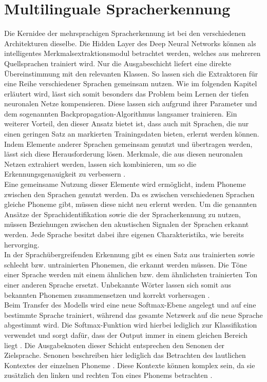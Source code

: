 \section{Multilinguale Spracherkennung}
Die Kernidee der mehrsprachigen Spracherkennung ist bei den verschiedenen Architekturen dieselbe. Die Hidden Layer des Deep Neural Networks können als intelligentes Merkmalsextraktionsmodul betrachtet werden, welches aus mehreren Quellsprachen trainiert wird. Nur die Ausgabeschicht liefert eine direkte Übereinstimmung mit den relevanten Klassen. So lassen sich die Extraktoren für eine Reihe verschiedener Sprachen gemeinsam nutzen. 
Wie im folgenden Kapitel erläutert wird, lässt sich somit besonders das Problem beim Lernen der tiefen neuronalen Netze kompensieren. Diese lassen sich aufgrund ihrer Parameter und dem sogenannten Backpropagation-Algorithmus langsamer trainieren. Ein weiterer Vorteil, den dieser Ansatz bietet ist, dass auch mit Sprachen, die nur einen geringen Satz an markierten Trainingsdaten bieten, erlernt werden können. Indem Elemente anderer Sprachen gemeinsam genutzt und übertragen werden, lässt sich diese Herausforderung lösen. Merkmale, die aus diesen neuronalen Netzen extrahiert werden, lassen sich kombinieren, um so die Erkennungsgenauigkeit zu verbessern {\cite{Yu.2014}}.
\\
Eine gemeinsame Nutzung dieser Elemente wird ermöglicht, indem Phoneme zwischen den Sprachen genutzt werden. Da es zwischen verschiedenen Sprachen gleiche Phoneme gibt, müssen diese nicht neu erlernt werden. Um die genannten Ansätze der Sprachidentifikation sowie die der Spracherkennung zu nutzen, müssen Beziehungen zwischen den akustischen Signalen der Sprachen erkannt werden. Jede Sprache besitzt dabei ihre eigenen Charakteristika, wie bereits hervorging. 
\\
In der Sprachübergreifenden Erkennung gibt es einen Satz aus trainierten sowie schlecht bzw. untrainierten Phonemen, die erkannt werden müssen. Die Töne einer Sprache werden mit einem ähnlichen bzw. dem ähnlichsten trainierten Ton einer anderen Sprache ersetzt. Unbekannte Wörter lassen sich somit aus bekannten Phonemen zusammensetzen und korrekt vorhersagen {\cite{UEBLER200153}}. 
\\
Beim Transfer des Modells wird eine neue Softmax-Ebene angelegt und auf eine bestimmte Sprache trainiert, während das gesamte Netzwerk auf die neue Sprache abgestimmt wird. Die Softmax-Funktion wird hierbei lediglich zur Klassifikation verwendet und sorgt dafür, dass der Output immer in einem gleichen Bereich liegt {\cite{Yu.2014}}. Die Ausgabeknoten dieser Schicht entsprechen den Senonen der Zielsprache. Senonen beschreiben hier lediglich das Betrachten des lautlichen Kontextes der einzelnen Phoneme {\cite{Yu.2014}}. Diese Kontexte können komplex sein, da sie zusätzlich den linken und rechten Ton eines Phonems betrachten {\cite{basic_concepts}}.
